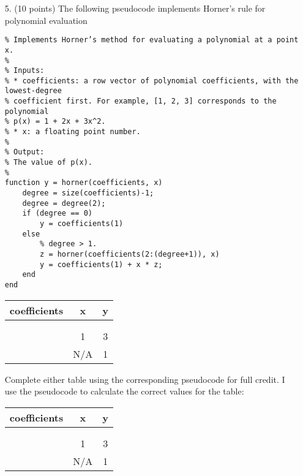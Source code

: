 \documentclass{article}
\begin{document}
\begin{enumerate}
    \newpage
    \item[5.] (10 points) The following pseudocode implements Horner’s rule for polynomial evaluation
    \begin{verbatim}
% Implements Horner’s method for evaluating a polynomial at a point x.
%
% Inputs:
% * coefficients: a row vector of polynomial coefficients, with the lowest-degree
% coefficient first. For example, [1, 2, 3] corresponds to the polynomial
% p(x) = 1 + 2x + 3x^2.
% * x: a floating point number.
%
% Output:
% The value of p(x).
%
function y = horner(coefficients, x)
    degree = size(coefficients)-1;
    degree = degree(2);
    if (degree == 0)
        y = coefficients(1)
    else
        % degree > 1.
        z = horner(coefficients(2:(degree+1)), x)
        y = coefficients(1) + x * z;
    end
end
    \end{verbatim}
    \begin{tabular}{ c|c|c } 
        coefficients & x & y \\ 
        \hline
        [1, 1, 3, 1] &  &  \\
        \hline
        [1, 3, 1] &  & \\ 
        \hline
        [3, 1] & 1 & 3 \\
        \hline
        [1] & N/A & 1
    \end{tabular}\newline
    Complete either table using the corresponding pseudocode for full credit.
    \newline
    \newline
    I use the pseudocode to calculate the correct values for the table: \newline\newline
    \begin{tabular}{ c|c|c } 
        coefficients & x & y \\ 
        \hline
        [1, 1, 3, 1] &  &  \\
        \hline
        [1, 3, 1] &  & \\ 
        \hline
        [3, 1] & 1 & 3 \\
        \hline
        [1] & N/A & 1
    \end{tabular}\newline
\end{enumerate}
\end{document}
